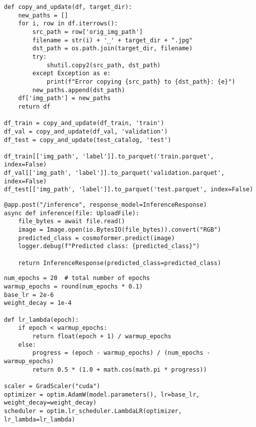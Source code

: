 \newpage

\begin{samepage}
\begin{lstlisting}[style=mypython, caption={Dataset saving code example}, label={lst:data-save}]
def copy_and_update(df, target_dir):
    new_paths = []
    for i, row in df.iterrows():
        src_path = row['orig_img_path']
        filename = str(i) + '_' + target_dir + ".jpg"
        dst_path = os.path.join(target_dir, filename)
        try:
            shutil.copy2(src_path, dst_path)
        except Exception as e:
            print(f"Error copying {src_path} to {dst_path}: {e}")
        new_paths.append(dst_path)
    df['img_path'] = new_paths
    return df

df_train = copy_and_update(df_train, 'train')
df_val = copy_and_update(df_val, 'validation')
df_test = copy_and_update(test_catalog, 'test')

df_train[['img_path', 'label']].to_parquet('train.parquet', index=False)
df_val[['img_path', 'label']].to_parquet('validation.parquet', index=False)
df_test[['img_path', 'label']].to_parquet('test.parquet', index=False)
\end{lstlisting}
\end{samepage}

\begin{samepage}
\begin{lstlisting}[style=mypython, caption={FastAPI endpoint decorator code example}, label={lst:be-post}]
@app.post("/inference", response_model=InferenceResponse)
async def inference(file: UploadFile):
    file_bytes = await file.read()
    image = Image.open(io.BytesIO(file_bytes)).convert("RGB")
    predicted_class = cosmoformer.predict(image)
    logger.debug(f"Predicted class: {predicted_class}")

    return InferenceResponse(predicted_class=predicted_class)
\end{lstlisting}
\end{samepage}

\begin{samepage}
\begin{lstlisting}[style=mypython, caption={Training setup code example}, label={lst:loop-setup}]
num_epochs = 20  # total number of epochs
warmup_epochs = round(num_epochs * 0.1)
base_lr = 2e-6
weight_decay = 1e-4

def lr_lambda(epoch):
    if epoch < warmup_epochs:
        return float(epoch + 1) / warmup_epochs
    else:
        progress = (epoch - warmup_epochs) / (num_epochs - warmup_epochs)
        return 0.5 * (1.0 + math.cos(math.pi * progress))

scaler = GradScaler("cuda")
optimizer = optim.AdamW(model.parameters(), lr=base_lr, weight_decay=weight_decay)
scheduler = optim.lr_scheduler.LambdaLR(optimizer, lr_lambda=lr_lambda)
\end{lstlisting}
\end{samepage}

